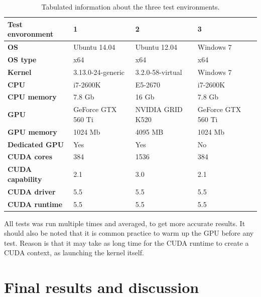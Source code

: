 \begin{table}[ht]
\centering
    \begin{tabular}{|l|l|l|l|}
        \hline
        \textbf{Test envoronment} & \textbf{1}         & \textbf{2}       & \textbf{3}\\ \hline
        \textbf{OS}               & Ubuntu 14.04       & Ubuntu 12.04     & Windows 7  \\ \hline
        \textbf{OS type}          & x64                & x64              & x64     \\ \hline
        \textbf{Kernel}           & 3.13.0-24-generic  & 3.2.0-58-virtual & Windows 7      \\ \hline
        \textbf{CPU}              & i7-2600K           & E5-2670          & i7-2600K       \\ \hline
        \textbf{CPU memory}       & 7.8 Gb             & 16 Gb            & 7.8 Gb \\ \hline
        \textbf{GPU}              & GeForce GTX 560 Ti & NVIDIA GRID K520 & GeForce GTX 560 Ti      \\ \hline
        \textbf{GPU memory}       & 1024 Mb            & 4095 MB          & 1024 Mb      \\ \hline
        \textbf{Dedicated GPU}    & Yes                & Yes              & No       \\ \hline
        \textbf{CUDA cores}       & 384                & 1536             & 384       \\ \hline
        \textbf{CUDA capability}  & 2.1                & 3.0              & 2.1       \\ \hline
        \textbf{CUDA driver}      & 5.5                & 5.5              & 5.5       \\ \hline
        \textbf{CUDA runtime}     & 5.5                & 5.5              & 5.5       \\ \hline
    \end{tabular}
    \caption{Tabulated information about the three test environments.}
    \label{tbl:test_envoronments}
\end{table}

All tests was run multiple times and averaged, to get more accurate results. It should also be noted that it is common practice to warm up the GPU before any test. Reason is that it may take as long time for the CUDA runtime to create a CUDA context, as launching the kernel itself.

\section{Final results and discussion} %
\label{sec:final_results_and_discusstion}

